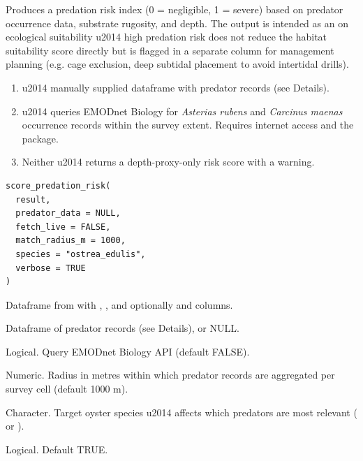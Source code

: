 \documentclass[a4paper]{book}
\begin{document}
\begin{Description}
Produces a predation risk index (0 = negligible, 1 = severe) based on
predator occurrence data, substrate rugosity, and depth. The output is
intended as an  on ecological suitability \bsl{}u2014 high predation risk
does not reduce the habitat suitability score directly but is flagged in
a separate column for management planning (e.g. cage exclusion, deep
subtidal placement to avoid intertidal drills).

\begin{enumerate}

\item{}  \bsl{}u2014 manually supplied dataframe with predator records
(see Details).
\item{}  \bsl{}u2014 queries EMODnet Biology for \emph{Asterias rubens} and
\emph{Carcinus maenas} occurrence records within the survey extent. Requires
internet access and the  package.
\item{} Neither \bsl{}u2014 returns a depth-proxy-only risk score with a warning.

\end{enumerate}

\end{Description}
%
\begin{Usage}
\begin{verbatim}
score_predation_risk(
  result,
  predator_data = NULL,
  fetch_live = FALSE,
  match_radius_m = 1000,
  species = "ostrea_edulis",
  verbose = TRUE
)
\end{verbatim}
\end{Usage}
%
\begin{Arguments}
\begin{ldescription}
\item[\code{result}] Dataframe from  with , , and
optionally  and  columns.

\item[\code{predator\_data}] Dataframe of predator records (see Details), or NULL.

\item[\code{fetch\_live}] Logical. Query EMODnet Biology API (default FALSE).

\item[\code{match\_radius\_m}] Numeric. Radius in metres within which predator
records are aggregated per survey cell (default 1000 m).

\item[\code{species}] Character. Target oyster species \bsl{}u2014 affects which predators
are most relevant ( or ).

\item[\code{verbose}] Logical. Default TRUE.
\end{ldescription}
\end{Arguments}
\end{document}
